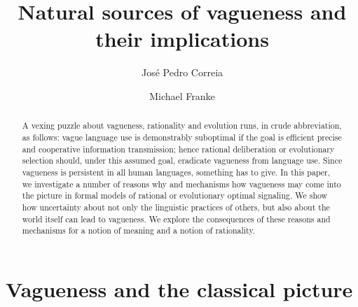 \documentclass[a4paper]{article}
\begin{document}
\title{Natural sources of vagueness and their implications}
\author{Jos\'e Pedro Correia \and Michael Franke}
\date{}

\maketitle

\begin{abstract}
A vexing puzzle about vagueness, rationality and evolution runs, in crude abbreviation, as follows: vague language use is demonstrably suboptimal if the goal is efficient precise and cooperative information transmission; hence rational deliberation or evolutionary selection should, under this assumed goal, eradicate vagueness from language use.
Since vagueness is persistent in all human languages, something has to give.
In this paper, we investigate a number of reasons why and mechanisms how vagueness may come into the picture in formal models of rational or evolutionary optimal signaling.
We show how uncertainty about not only the linguistic practices of others, but also about the world itself can lead to vagueness.
We explore the consequences of these reasons and mechanisms for a notion of meaning and a notion of rationality.
\end{abstract}

\tableofcontents


\section{Vagueness and the classical picture}
\label{sec:vagueness}
\end{document}
